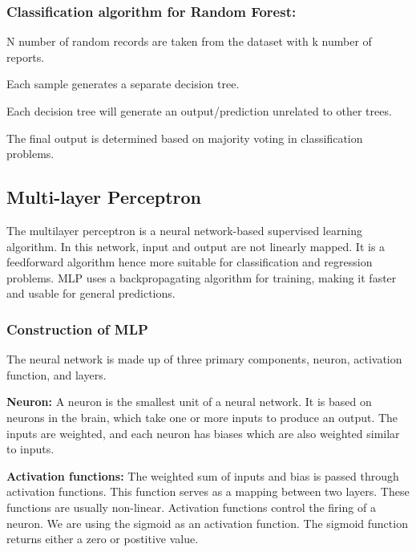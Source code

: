 \subsubsection{Classification algorithm for Random Forest:}
\begin{steps}
  \vspace{-0.5em}
  \setlength{\itemsep}{-0.2em}
  \item N number of random records are taken from the dataset with k number of reports.
  \item Each sample generates a separate decision tree.
  \item Each decision tree will generate an output/prediction unrelated to other trees.
  \item The final output is determined based on majority voting in classification problems.
  \vspace{-1em}
\end{steps}

\subsection{Multi-layer Perceptron} \label{subsec:multi_layer_perceptron}
The multilayer perceptron is a neural network-based supervised learning algorithm. In this network, input and output are not linearly mapped. It is a feedforward algorithm hence more suitable for classification and regression problems. MLP uses a backpropagating algorithm for training, making it faster and usable for general predictions.

\subsubsection{Construction of MLP}
\vspace{-0.5em}
The neural network is made up of three primary components, neuron, activation function, and layers.

\vspace{-1em}
\textbf{Neuron:}
A neuron is the smallest unit of a neural network. It is based on neurons in the brain, which take one or more inputs to produce an output. The inputs are weighted, and each neuron has biases which are also weighted similar to inputs.

\vspace{-1em}
\textbf{Activation functions:}
The weighted sum of inputs and bias is passed through activation functions. This function serves as a mapping between two layers. These functions are usually non-linear. Activation functions control the firing of a neuron. We are using the sigmoid as an activation function. The sigmoid function returns either a zero or postitive value.

